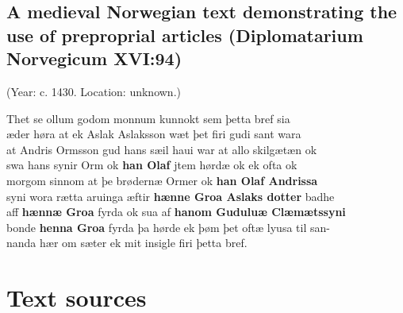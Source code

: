 \section{A medieval Norwegian text demonstrating the use of preproprial articles (Diplomatarium Norvegicum XVI:94)}

 (Year: c. 1430. Location: unknown.)

Thet se ollum godom monnum kunnokt sem þetta bref sia\\
æder høra at ek Aslak Aslaksson wæt þet firi gudi sant wara\\
at Andris Ormsson gud hans sæil haui war at allo skilgætæn ok\\
swa hans synir Orm ok \textbf{han Olaf} jtem hørdæ ok ek ofta ok\\
morgom sinnom at þe brødernæ Ormer ok \textbf{han Olaf Andrissa}\\
syni wora rætta aruinga æftir \textbf{hænne Groa Aslaks dotter} badhe\\
aff \textbf{hænnæ Groa} fyrda ok sua af \textbf{hanom Guduluæ Clæmætssyni}\\
bonde \textbf{henna Groa} fyrda þa hørde ek þøm þet oftæ lyusa til san-\\
nanda hær om sæter ek mit insigle firi þetta bref.

\chapter[Text sources]{Text sources}

